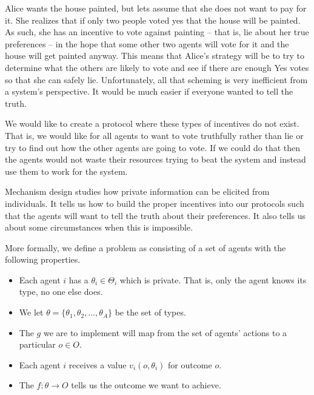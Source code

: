 Alice wants the house painted, but lets assume that she does not want
to pay for it. She realizes that if only two people voted yes that the
house will be painted. As such, she has an incentive to vote against
painting -- that is, lie about her true preferences -- in the hope that
some other two agents will vote for it and the house will get painted
anyway. This means that Alice's strategy will be to try to determine
what the others are likely to vote and see if there are enough Yes
votes so that she can safely lie. Unfortunately, all that scheming is
very inefficient from a system's perspective. It would be much easier
if everyone wanted to tell the truth.

We would like to create a protocol where these types of incentives do
not exist. That is, we would like for all agents to want to vote
truthfully rather than lie or try to find out how the other agents are
going to vote. If we could do that then the agents would not waste
their resources trying to beat the system and instead use them to work
for the system.

Mechanism design \cite[Chapter 23]{mas-colell95a} studies how private
information can be elicited from individuals. It tells us how to build
the proper incentives into our protocols such that the agents will
want to tell the truth about their preferences.  It also tells us
about some circumstances when this is impossible.

More formally, we define a  problem as consisting
of a set of agents with the following properties.

\begin{itemize}
\item Each agent $i$ has a  $\theta_i \in \Theta_i$ which
  is private. That is, only the agent knows its type, no one else
  does.

\item We let $\theta = \{\theta_1, \theta_2,\ldots,
  \theta_A\}$ be the set of types.

\item The  $g$ we are to implement will map from the set
  of agents' actions to a particular  $o \in O$.

\item Each agent $i$ receives a value $v_i(o,\theta_i)$ for outcome
  $o$. 

\item The  $f: \theta \rightarrow O$
  tells us the outcome we want to achieve.
\end{itemize}

